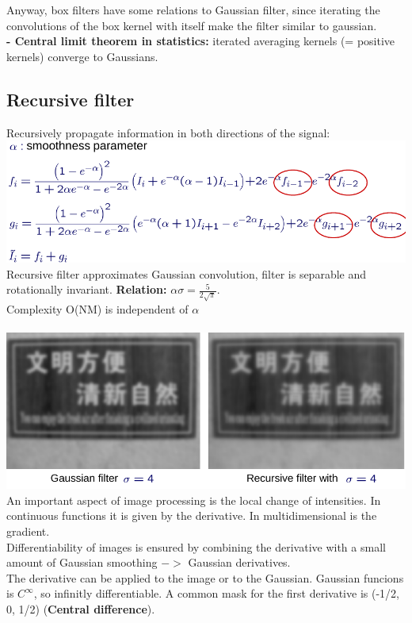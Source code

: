 \documentclass{article}
\begin{document}
Anyway, box filters have some relations to Gaussian filter, since iterating the convolutions of the box kernel with itself make the filter similar to gaussian.\\
\textbf{- Central limit theorem in statistics: }iterated averaging kernels (= positive kernels) converge to Gaussians.\\
\subsection{Recursive filter}
Recursively propagate information in both directions of the signal:\\
\includegraphics[scale=0.35]{26.png}\\
Recursive filter approximates Gaussian convolution, filter is separable and rotationally
invariant. \textbf{Relation:} $\alpha \sigma = \frac{5}{2\sqrt{\pi}}$.\\
Complexity O(NM) is independent of $\alpha$\\\\
\includegraphics[scale=0.35]{27.png}\\
An important aspect of image processing is the local change of intensities. In continuous functions it is given by the derivative. In multidimensional is the gradient.\\
Differentiability of images is ensured by combining the derivative with a small amount of Gaussian smoothing $->$ Gaussian derivatives.\\
The derivative can be applied to the image or to the Gaussian. Gaussian funcions is $C^\infty$, so infinitly differentiable. A common mask for the first derivative is (-1/2, 0, 1/2) (\textbf{Central difference}).\\
\end{document}
